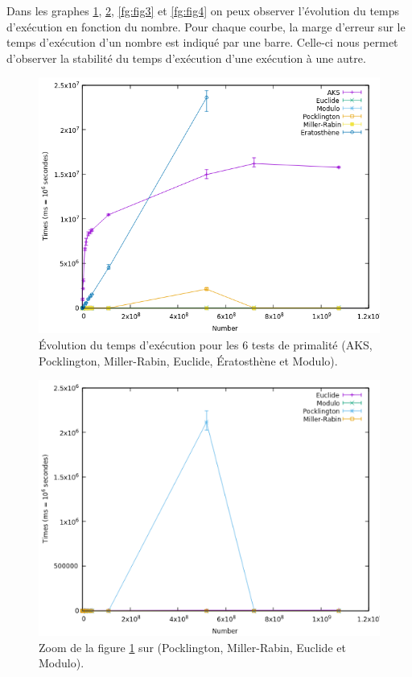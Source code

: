 	Dans les graphes \ref{fg:fig1}, \ref{fg:fig2}, \ref{fg:fig3} et \ref{fg:fig4} on peux observer l'évolution du temps d'exécution en fonction du nombre. Pour chaque courbe, la marge d'erreur sur le temps d'exécution d'un nombre est indiqué par une barre. Celle-ci nous permet d'observer la stabilité du temps d'exécution d'une exécution à une autre.
\begin{figure}[!ht]	
		\begin{center}\includegraphics[scale=0.6]{result.png}\end{center}
		\caption{Évolution du temps d'exécution pour les 6 tests de primalité (AKS, Pocklington, Miller-Rabin, Euclide, Ératosthène et Modulo). }
		\label{fg:fig1}
\end{figure}
\begin{figure}[!ht]	
		\begin{center}\includegraphics[scale=0.6]{Zoom1.png}\end{center}
		\caption{Zoom de la figure \ref{fg:fig1} sur (Pocklington, Miller-Rabin, Euclide et Modulo).}
		\label{fg:fig2}
\end{figure}
